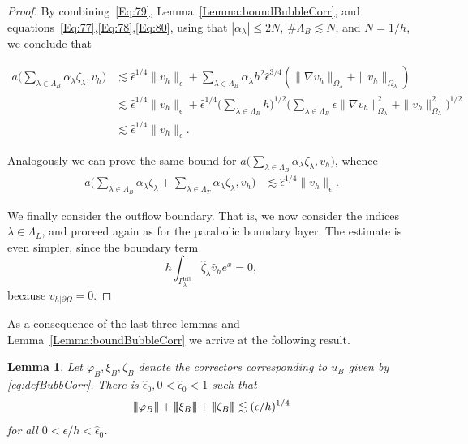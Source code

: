 \documentclass{article}
\newcommand{\vvvert}{\ensuremath|\!|\!|\xspace}
\newtheorem{lemma}[thm]{Lemma}
\newcommand{\summLA}[1][{}]{\ensuremath{\sum_{\lambda\in\Lambda_{#1}}\alpha_\lambda}}
\newcommand{\summL}[1][{}]{\ensuremath{\sum_{\lambda\in\Lambda_{#1}}}}
\newcommand{\Gammaleft}{\ensuremath{\Gamma_\lambda^{\text{left}}}\xspace}
\begin{document}
\begin{proof}
By combining~\eqref{Eq:79}, Lemma~\ref{Lemma:boundBubbleCorr}, and equations~\eqref{Eq:77},\eqref{Eq:78},\eqref{Eq:80}, using that $|\alpha_\lambda |\le 2N$, $\#\Lambda_B \lesssim N$, and $N = 1/h$, we conclude that

$$
\begin{aligned}
a\Big(\summLA[B] \zeta_\lambda,v_h\Big) 
    &\lesssim 
    \hat{\epsilon}^{1/4} \|v_h\|_\epsilon
 +  \summLA[B] h^2 \hat{\epsilon}^{3/4} (\|\nabla v_h\|_{\Omega_\lambda} +  \|v_h\|_{\Omega_\lambda}) \\
  & \lesssim
  \hat{\epsilon}^{1/4} \|v_h\|_\epsilon
 +  \hat{\epsilon}^{1/4} \Big(\summL[B] h\Big)^{1/2}  \Big(\summL[B] \epsilon \|\nabla v_h\|_{\Omega_\lambda}^2 + \|v_h\|_{\Omega_\lambda}^2\Big)^{1/2}  \\
   & \lesssim \hat{\epsilon}^{1/4} \|v_h\|_\epsilon.
\end{aligned}
$$

Analogously we can prove the same bound for $a\Big(\summLA[B] \zeta_\lambda,v_h\Big) $, whence
$$
\begin{aligned}
a\Big(\summLA[B] \zeta_\lambda+\summLA[T] \zeta_\lambda,v_h\Big) 
   & \lesssim \hat{\epsilon}^{1/4} \|v_h\|_\epsilon.
\end{aligned}
$$

We finally consider the outflow boundary. That is, we now consider the indices $\lambda\in\Lambda_L$, and
proceed again as for the parabolic boundary layer. The estimate is even simpler, 
since the boundary term
$$
h\int_{\Gammaleft} \hat{\zeta}_\lambda \hat{v}_h e^x = 0,
$$ because $v_{h|\partial\Omega}=0$.
%
\end{proof}

As a consequence of the last three lemmas and Lemma~\ref{Lemma:boundBubbleCorr} we arrive at the following result.

\begin{lemma}\label{Lemma:13}
Let $\varphi_B, \xi_B, \zeta_B$ denote the correctors corresponding to $u_B$ given by \eqref{eq:defBubbCorr}. There is  $\hat{\epsilon}_0, 0 < \hat{\epsilon}_0 < 1$ such that
$$
\vvvert \varphi_B\vvvert   +  \vvvert \xi_B\vvvert  + \vvvert \zeta_B\vvvert   \lesssim  (\epsilon/h)^{1/4}
$$
for all $0<\epsilon/h < \hat{\epsilon}_0$.
\end{lemma}
\end{document}
